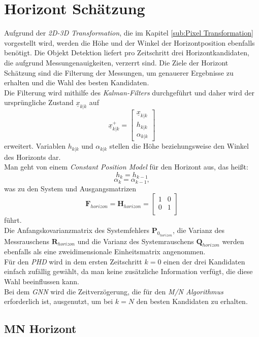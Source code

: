 \documentclass[10pt,a4paper]{article}
\begin{document}
\section{Horizont Schätzung}
Aufgrund der \textit{2D-3D Transformation}, die im Kapitel \ref{sub:Pixel Transformation} vorgestellt wird, werden die Höhe und der Winkel der Horizontposition ebenfalls benötigt. Die Objekt Detektion liefert pro Zeitschritt drei Horizontkandidaten, die aufgrund Messungenauigkeiten, verzerrt sind. Die Ziele der Horizont Schätzung sind die Filterung der Messungen, um genauerer Ergebnisse zu erhalten und die Wahl des besten Kandidaten.\\
Die Filterung wird mithilfe des \textit{Kalman-Filters} durchgeführt und daher wird der ursprüngliche Zustand $\underline{x}_{k|k}$ auf 
\begin{equation}
\underline{x}^+_{k|k} = \begin{bmatrix}
\underline{x}_{k|k} \\
h_{k|k}\\
\alpha_{k|k}
\end{bmatrix}
\end{equation}
erweitert. Variablen $h_{k|k}$ und $\alpha_{k|k}$ stellen die Höhe beziehungsweise den Winkel des Horizonts dar.\\
Man geht von einem \textit{Constant Position Model} für den Horizont aus, das heißt:\\
\begin{equation}
h_k = h_{k-1}
\end{equation}
\begin{equation*}
\alpha_k = \alpha_{k-1},
\end{equation*}
was zu den System und Ausgangsmatrizen
\begin{equation}
\textbf{F}_{horizon} = \textbf{H}_{horizon} = \begin{bmatrix}
1 & 0  \\
0 & 1\\
\end{bmatrix}
\end{equation}
führt.\\
Die Anfangskovarianzmatrix des Systemfehlers $\textbf{P}_{0_{horizon}}$, die Varianz des Messrauschens $\textbf{R}_{horizon}$ und die Varianz des Systemrauschens $\textbf{Q}_{horizon}$ werden ebenfalls als eine zweidimensionale Einheitsmatrix angenommen.\\
Für den \textit{PHD} wird in dem ersten Zeitschritt $k = 0$ einen der drei Kandidaten einfach zufällig gewählt, da man keine zusätzliche Information verfügt, die diese Wahl beeinflussen kann.\\
Bei dem \textit{GNN} wird die Zeitverzögerung, die für den \textit{M/N Algorithmus} erforderlich ist, ausgenutzt, um bei $k = N$ den besten Kandidaten zu erhalten.
\subsection{MN Horizont}
\end{document}
